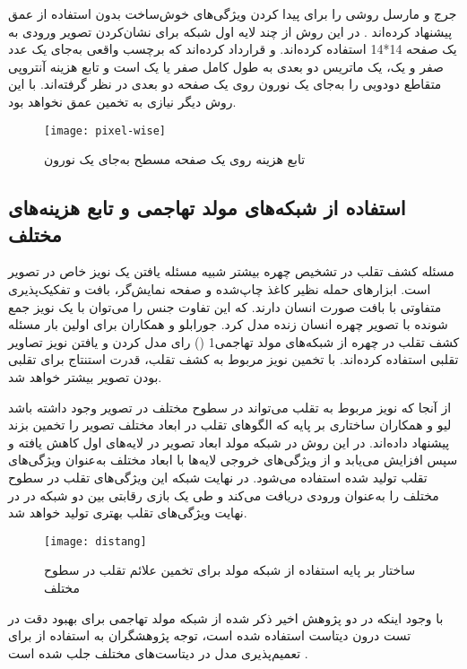  جرج و مارسل روشی را برای پیدا کردن ویژگی‌های خوش‌ساخت بدون استفاده از عمق پیشنهاد کرده‌اند
 \cite{george2019deep}.
 در این روش از چند لایه اول شبکه 
\cite{huang2017densely}
برای نشان‌کردن تصویر ورودی به یک صفحه 14*14 استفاده کرده‌اند. و قرارداد کرده‌اند که برچسب واقعی به‌جای یک عدد صفر و یک، یک ماتریس دو بعدی به طول کامل صفر یا یک است و تابع هزینه آنتروپی متقاطع دودویی را به‌جای یک نورون روی یک صفحه دو بعدی در نظر گرفته‌اند. با این روش دیگر نیازی به تخمین عمق نخواهد بود.
\begin{figure}[h]
	\centerline{\texttt{[image: pixel-wise]}}
	\caption{تابع هزینه  روی یک صفحه مسطح به‌جای یک نورون \cite{george2019deep} }
	\label{fig:pixel-wise}
\end{figure}
\subsection{استفاده از شبکه‌های مولد تهاجمی و تابع هزینه‌های مختلف}
مسئله کشف تقلب در تشخیص چهره بیشتر شبیه مسئله یافتن یک نویز خاص در تصویر است. ابزارهای حمله نظیر کاغذ چاپ‌شده و صفحه نمایش‌گر، بافت و تفکیک‌پذیری متفاوتی با بافت صورت انسان دارند. که این تفاوت جنس را می‌توان با یک نویز جمع شونده با تصویر چهره انسان زنده مدل کرد. جورابلو و همکاران
\cite{jourabloo2018face}
برای اولین بار مسئله کشف تقلب در چهره از شبکه‌های مولد تهاجمی1 ()
\cite{goodfellow2014generative}
رای مدل کردن و یافتن نویز تصاویر تقلبی استفاده کرده‌اند. با تخمین نویز مربوط به کشف تقلب، قدرت استنتاج برای تقلبی بودن تصویر بیشتر خواهد شد.

از آنجا که نویز مربوط به تقلب می‌تواند در سطوح مختلف در تصویر وجود داشته باشد لیو و همکاران
\cite{liu2020disentangling}
ساختاری بر پایه  که الگوهای تقلب در ابعاد مختلف تصویر را تخمین بزند پیشنهاد داده‌اند. در این روش در شبکه مولد
ابعاد تصویر در لایه‌های اول کاهش یافته و سپس افزایش می‌یابد و از ویژگی‌های خروجی لایه‌ها با ابعاد مختلف به‌عنوان ویژگی‌های تقلب تولید شده استفاده می‌شود. در نهایت شبکه  
این ویژگی‌های تقلب در سطوح مختلف را به‌عنوان ورودی دریافت می‌کند و طی یک بازی رقابتی بین دو شبکه در  در نهایت ویژگی‌های تقلب بهتری تولید خواهد شد. 
\begin{figure}[h]
	\centerline{\texttt{[image: distang]}}
	\caption{ساختار بر پایه استفاده از شبکه مولد برای تخمین علائم تقلب در سطوح مختلف \cite{liu2020disentangling} }
	\label{fig:pixel-wise}
\end{figure}

با وجود اینکه در دو پژوهش اخیر ذکر شده
\cite{jourabloo2018face,liu2020disentangling}
از شبکه مولد تهاجمی برای بهبود دقت در تست درون دیتاست استفاده شده است، توجه پژوهشگران به استفاده از  برای تعمیم‌پذیری مدل در دیتاست‌های مختلف جلب شده است
\cite{shao2019multi,jia2020single}.

